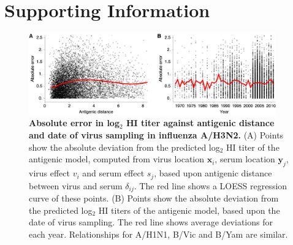 \documentclass[11pt,oneside,letterpaper]{article}
\newcommand{\virus}{\mathbf{x}}						%
\newcommand{\serum}{\mathbf{y}}						%
\newcommand{\ve}{v}									%
\newcommand{\se}{s}									%
\begin{document}



\pagebreak

\setcounter{figure}{0}
\setcounter{table}{0}
\renewcommand{\thefigure}{S\arabic{figure}}
\renewcommand{\thetable}{S\arabic{table}}

\section*{Supporting Information}

\begin{figure}[H]
	\centering		
	\includegraphics[width=0.95\textwidth]{figures/error_by_distance_and_year}
	\caption{\textbf{Absolute error in log$_2$ HI titer against antigenic distance and date of virus sampling in influenza A/H3N2.} 
	(A) Points show the absolute deviation from the predicted log$_2$ HI titer of the antigenic model, computed from virus location $\virus_i$, serum location $\serum_j$, virus effect $\ve_i$ and serum effect $\se_j$, based upon antigenic distance between virus and serum $\delta_{ij}$.
	The red line shows a LOESS regression curve of these points.
	(B) Points show the absolute deviation from the predicted log$_2$ HI titers of the antigenic model, based upon the date of virus sampling.
	The red line shows average deviations for each year.
	Relationships for A/H1N1, B/Vic and B/Yam are similar.
	} 
	\label{error_by_distance_and_year} 
\end{figure}
\end{document}
